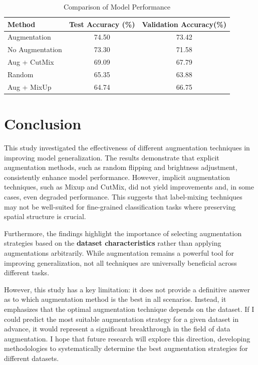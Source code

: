 \documentclass{article}
\begin{document}
\begin{table}[h]
  \caption{Comparison of Model Performance}
  \label{model-performance}
  \centering
  \begin{tabular}{lcc}
    \toprule
    Method              & Test Accuracy (\%) & Validation Accuracy(\%) \\
    \midrule
    Augmentation        & 74.50         & 73.42            \\
    No Augmentation     & 73.30         & 71.58            \\
    Aug + CutMix        & 69.09         & 67.79            \\
    Random              & 65.35         & 63.88            \\
    Aug + MixUp         & 64.74         & 66.75            \\
    \bottomrule
  \end{tabular}
\end{table}

\newpage

\section{Conclusion}
\label{others}


This study investigated the effectiveness of different augmentation techniques in improving model generalization. The results demonstrate that explicit augmentation methods, such as random flipping and brightness adjustment, consistently enhance model performance. However, implicit augmentation techniques, such as Mixup and CutMix, did not yield improvements and, in some cases, even degraded performance. This suggests that label-mixing techniques may not be well-suited for fine-grained classification tasks where preserving spatial structure is crucial.

Furthermore, the findings highlight the importance of selecting augmentation strategies based on the {\bf dataset characteristics} rather than applying augmentations arbitrarily. While augmentation remains a powerful tool for improving generalization, not all techniques are universally beneficial across different tasks.

However, this study has a key limitation: it does not provide a definitive answer as to which augmentation method is the best in all scenarios. Instead, it emphasizes that the optimal augmentation technique depends on the dataset. If I could predict the most suitable augmentation strategy for a given dataset in advance, it would represent a significant breakthrough in the field of data augmentation. I hope that future research will explore this direction, developing methodologies to systematically determine the best augmentation strategies for different datasets.
\end{document}
